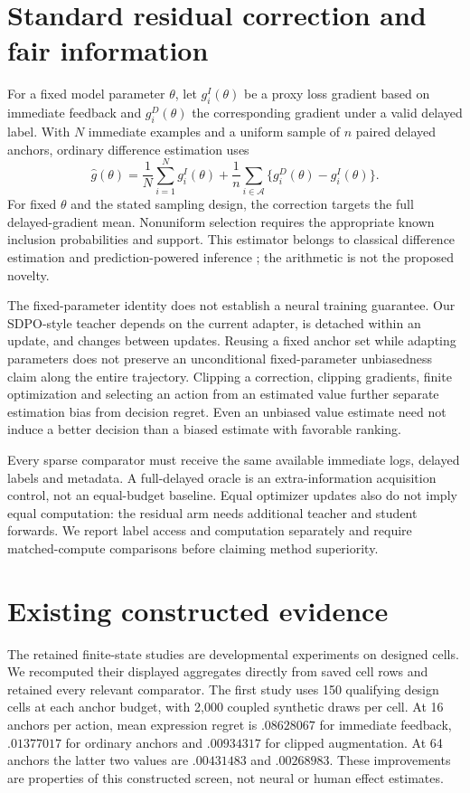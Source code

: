 \documentclass{article}
\begin{document}
\section{Standard residual correction and fair information}
For a fixed model parameter $\theta$, let $g_i^{I}(\theta)$ be a proxy loss
gradient based on immediate feedback and $g_i^{D}(\theta)$ the corresponding
gradient under a valid delayed label. With $N$ immediate examples and a uniform
sample of $n$ paired delayed anchors, ordinary difference estimation uses
\begin{equation}
 \widehat g(\theta)=\frac1N\sum_{i=1}^{N}g_i^I(\theta)
 +\frac1n\sum_{i\in\mathcal A}\{g_i^D(\theta)-g_i^I(\theta)\}.
 \label{eq:difference}
\end{equation}
For fixed $\theta$ and the stated sampling design, the correction targets the
full delayed-gradient mean. Nonuniform selection requires the appropriate
known inclusion probabilities and support. This estimator belongs to classical
difference estimation and prediction-powered inference \citep{ppi}; the
arithmetic is not the proposed novelty.

The fixed-parameter identity does not establish a neural training guarantee.
Our SDPO-style teacher depends on the current adapter, is detached within an
update, and changes between updates. Reusing a fixed anchor set while adapting
parameters does not preserve an unconditional fixed-parameter unbiasedness
claim along the entire trajectory. Clipping a correction, clipping gradients,
finite optimization and selecting an action from an estimated value further
separate estimation bias from decision regret. Even an unbiased value estimate
need not induce a better decision than a biased estimate with favorable ranking.

Every sparse comparator must receive the same available immediate logs,
delayed labels and metadata. A full-delayed oracle is an extra-information
acquisition control, not an equal-budget baseline. Equal optimizer updates also
do not imply equal computation: the residual arm needs additional teacher and
student forwards. We report label access and computation separately and require
matched-compute comparisons before claiming method superiority.

\section{Existing constructed evidence}
\label{sec:finite}
The retained finite-state studies are developmental experiments on designed
cells. We recomputed their displayed aggregates directly from saved cell rows
and retained every relevant comparator. The first study uses 150 qualifying
design cells at each anchor budget, with 2,000 coupled synthetic draws per cell.
At 16 anchors per action, mean expression regret is $.08628067$ for immediate
feedback, $.01377017$ for ordinary anchors and $.00934317$ for clipped
augmentation. At 64 anchors the latter two values are $.00431483$ and
$.00268983$. These improvements are properties of this constructed screen, not
neural or human effect estimates.
\end{document}
